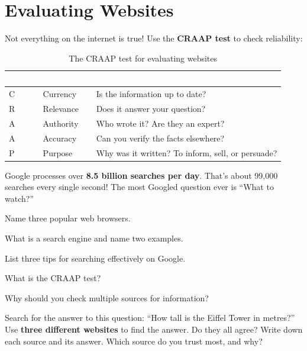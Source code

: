 \section{Evaluating Websites}
\label{sec:evaluate}

Not everything on the internet is true! Use the \textbf{CRAAP test} to check reliability:

\begin{table}[H]
\centering
\caption{The CRAAP test for evaluating websites}
\label{tab:craap}
\renewcommand{\arraystretch}{1.3}
\begin{tabularx}{\textwidth}{l l X}
\toprule
\rowcolor{HeaderRow}
\textcolor{white}{\textbf{Letter}} & \textcolor{white}{\textbf{Stands For}} & \textcolor{white}{\textbf{Ask Yourself}} \\
\midrule
\rowcolor{RowLight} C & Currency & Is the information up to date? \\
\rowcolor{RowDark} R & Relevance & Does it answer your question? \\
\rowcolor{RowLight} A & Authority & Who wrote it? Are they an expert? \\
\rowcolor{RowDark} A & Accuracy & Can you verify the facts elsewhere? \\
\rowcolor{RowLight} P & Purpose & Why was it written? To inform, sell, or persuade? \\
\bottomrule
\end{tabularx}
\end{table}


\begin{funfact}
Google processes over \textbf{8.5 billion searches per day}. That's about 99,000 searches every single second! The most Googled question ever is ``What to watch?''
\end{funfact}

\begin{reviewqs}
  \item Name three popular web browsers.
  \item What is a search engine and name two examples.
  \item List three tips for searching effectively on Google.
  \item What is the CRAAP test?
  \item Why should you check multiple sources for information?
\end{reviewqs}

\begin{challenge}
Search for the answer to this question: ``How tall is the Eiffel Tower in metres?'' Use \textbf{three different websites} to find the answer. Do they all agree? Write down each source and its answer. Which source do you trust most, and why?
\end{challenge}

